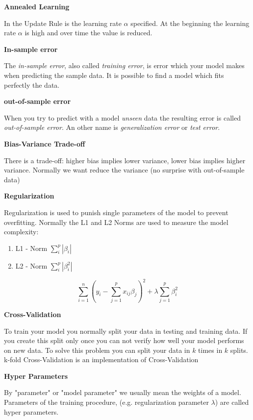 \documentclass[11pt,twoside,landscape]{article}
\begin{document}
\begin{multicols}{3}
\textbf{Annealed Learning}

In the Update Rule is the learning rate \(\alpha\) specified.
At the beginning the learning rate \(\alpha\) is high and over time the value is reduced.


\textbf{In-sample error}

The \emph{in-sample error}, also called \emph{training error}, is error which your model makes when predicting the sample data.
It is possible to find a model which fits perfectly the data.

\textbf{out-of-sample error}

When you try to predict with a model \emph{unseen} data the resulting error is called \emph{out-of-sample error}.
An other name is \emph{generalization error} or \emph{test error}.


\textbf{Bias-Variance Trade-off}

There is a trade-off: higher bias implies lower variance, lower bias implies higher variance.
Normally we want reduce the variance (no surprise with out-of-sample data)


\textbf{Regularization}

Regularization is used to punish single parameters of the model to prevent overfitting.
Normally the L1 and L2 Norms are used to measure the model complexity:
\begin{enumerate}
\item L1 - Norm \(\sum_i^p |\beta_i|\)
\item L2 - Norm \(\sum_i^p |\beta_i^2|\)
\end{enumerate}

\begin{equation}
  \sum_{i=1}^n(y_i - \sum_{j=1}^p x_{ij}\beta_j)^2 + \lambda \sum_{j=1}^p\beta_i^2
\end{equation}


\textbf{Cross-Validation}

To train your model you normally split your data in testing and training data.
If you create this split only once you can not verify how well your model performs on new data.
To solve this problem you can split your data in \(k\) times in \(k\) splits.
k-fold Cross-Validation is an implementation of Cross-Validation


\textbf{Hyper Parameters}

By "parameter" or "model parameter" we usually mean the weights of a model.
Parameters of the training procedure, (e.g. regularization parameter \(\lambda\)) are called hyper parameters.


\end{multicols}
\end{document}
